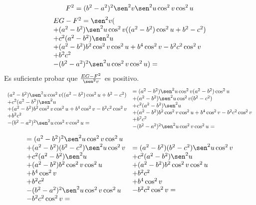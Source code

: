 \documentclass{article}
\begin{document}
$$
F^2 = (b^2 - a^2)^2 \sen^2 v \sen^2 u \cos^2 v \cos^2 u
$$
$$
\begin{array}{l}
  EG-F^2
  = \sen^2 v ( \\
  + (a^2-b^2)\sen^2 u \cos^2 v ((a^2-b^2) \cos^2 u + b^2 - c^2) \\
  + c^2(a^2-b^2)\sen^2 u \\
  + (a^2-b^2) b^2 \cos^2 v \cos^2 u + b^4 \cos^2 v - b^2c^2 \cos^2 v \\
  + b^2 c^2 \\
  - (b^2 - a^2)^2\sen^2 u \cos^2 v \cos^2 u) =
\end{array}
$$
Es suficiente probar que $\frac{EG-F^2}{\sen^2 v}$ es positivo.
$$
\begin{array}{l}
  (a^2-b^2)\sen^2 u \cos^2 v ((a^2-b^2) \cos^2 u + b^2 - c^2) \\
  + c^2(a^2-b^2)\sen^2 u \\
  + (a^2-b^2) b^2 \cos^2 v \cos^2 u + b^4 \cos^2 v - b^2c^2 \cos^2 v \\
  + b^2 c^2 \\
  - (b^2 - a^2)^2\sen^2 u \cos^2 v \cos^2 u =
\end{array}
\begin{array}{l}
  = (a^2-b^2)\sen^2 u \cos^2 v (a^2-b^2) \cos^2 u \\
  + (a^2-b^2)\sen^2 u \cos^2 v (b^2 - c^2) \\
  + c^2(a^2-b^2)\sen^2 u \\
  + (a^2-b^2) b^2 \cos^2 v \cos^2 u + b^4 \cos^2 v - b^2c^2 \cos^2 v \\
  + b^2 c^2 \\
  - (b^2 - a^2)^2\sen^2 u \cos^2 v \cos^2 u =
\end{array}
$$
$$
\begin{array}{l}
  = (a^2-b^2)^2 \sen^2 u \cos^2 v \cos^2 u \\
  + (a^2-b^2)(b^2 - c^2) \sen^2 u \cos^2 v \\
  + c^2(a^2-b^2)\sen^2 u \\
  + (a^2-b^2) b^2 \cos^2 v \cos^2 u \\
  + b^4 \cos^2 v \\
  + b^2 c^2 \\
  - (b^2 - a^2)^2\sen^2 u \cos^2 v \cos^2 u \\
  - b^2c^2 \cos^2 v =
\end{array}
\begin{array}{l}
  = (a^2-b^2)(b^2 - c^2) \sen^2 u \cos^2 v \\
  + c^2(a^2-b^2)\sen^2 u \\
  + (a^2-b^2) b^2 \cos^2 v \cos^2 u \\
  + b^2 c^2 \\
  + b^4 \cos^2 v \\
  - b^2c^2 \cos^2 v =
\end{array}
$$
\end{document}
